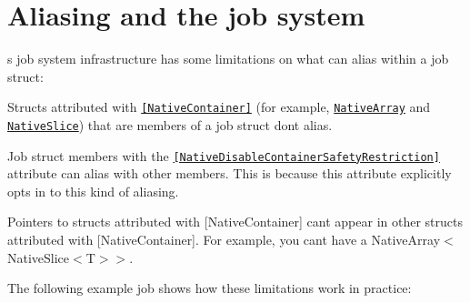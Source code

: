 \chapter{Aliasing and the job system}
\hypertarget{md__hey_tea_9_2_library_2_package_cache_2com_8unity_8burst_0d1_88_87_2_documentation_0i_2aliasing-job-system}{}\label{md__hey_tea_9_2_library_2_package_cache_2com_8unity_8burst_0d1_88_87_2_documentation_0i_2aliasing-job-system}
\label{md__hey_tea_9_2_library_2_package_cache_2com_8unity_8burst_0d1_88_87_2_documentation_0i_2aliasing-job-system_autotoc_md276}%
%
 \textquotesingle{}s job system infrastructure has some limitations on what can alias within a job struct\+:


\begin{DoxyItemize}
\item Structs attributed with \href{https://docs.unity3d.com/ScriptReference/Unity.Collections.LowLevel.Unsafe.NativeContainerAttribute.html}{\texttt{ {\ttfamily \mbox{[}Native\+Container\mbox{]}}}} (for example, \href{https://docs.unity3d.com/ScriptReference/Unity.Collections.NativeArray_1.html}{\texttt{ {\ttfamily Native\+Array}}} and \href{https://docs.unity3d.com/ScriptReference/Unity.Collections.NativeSlice_1.html}{\texttt{ {\ttfamily Native\+Slice}}}) that are members of a job struct don\textquotesingle{}t alias.
\item Job struct members with the \href{https://docs.unity3d.com/ScriptReference/Unity.Collections.LowLevel.Unsafe.NativeDisableContainerSafetyRestrictionAttribute.html}{\texttt{ {\ttfamily \mbox{[}Native\+Disable\+Container\+Safety\+Restriction\mbox{]}}}} attribute can alias with other members. This is because this attribute explicitly opts in to this kind of aliasing.
\item Pointers to structs attributed with {\ttfamily \mbox{[}Native\+Container\mbox{]}} can\textquotesingle{}t appear in other structs attributed with {\ttfamily \mbox{[}Native\+Container\mbox{]}}. For example, you can\textquotesingle{}t have a {\ttfamily Native\+Array\texorpdfstring{$<$}{<}Native\+Slice\texorpdfstring{$<$}{<}T\texorpdfstring{$>$}{>}\texorpdfstring{$>$}{>}}.
\end{DoxyItemize}

The following example job shows how these limitations work in practice\+:


